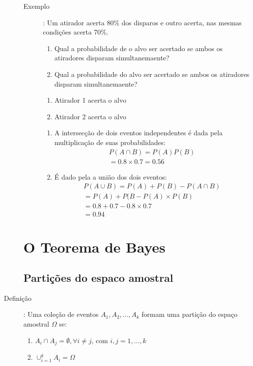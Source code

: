 \documentclass[11pt,a4paper]{book}
\begin{document}
\begin{description}
\begin{description}
    \item[Exemplo]: Um atirador acerta 80\% dos disparos e outro acerta, nas mesmas condições
      acerta 70\%.
      \begin{enumerate}[label=(\alph*)]
        \item Qual a probabilidade de o alvo ser acertado se ambos os atiradores disparam 
          simultanemaente?
        \item Qual a probabilidade do alvo ser acertado se ambos os atiradores disparam 
          simultanemaente?
      \end{enumerate}
      \begin{enumerate}[label=\Alph*:]
        \item  Atirador 1 acerta o alvo
        \item Atirador 2 acerta o alvo
      \end{enumerate}
      \begin{enumerate}[label=(\alph*)]
        \item  A intersecção de dois eventos independentes é dada pela multiplicação de suas probabilidades:
          \begin{align*}
            P(A \cap B)= P(A)P(B)\\
            =0.8 \times 0.7= 0.56
          \end{align*}
        \item É dado pela a união dos dois eventos:
          \begin{align*}
            P(A \cup B)= P(A)+ P(B)- P( A \cap B )\\
            = P(A) + P(B- P(A)\times P(B)\\
            = 0.8+0.7 - 0.8\times 0.7\\
            =0.94
          \end{align*}
      \end{enumerate}

  \end{description}
  \section{O Teorema de Bayes}
  \subsection{Partições do espaco amostral}
\item[Definição]: Uma coleção de eventos $A_1, A_2, \ldots, A_k$ formam uma partição 
  do espaço amostral $\Omega$ se:

  \begin{enumerate}[leftmargin=*, label=\Roman*., widest=IV, align=left]
    \item $A_i \cap A_j = \emptyset, \forall i\neq j$, com $i,j =1,\ldots,k$
    \item $\cup_{i=1}^{k}A_i= \Omega$
  \end{enumerate}
   \end{description}
\end{document}
